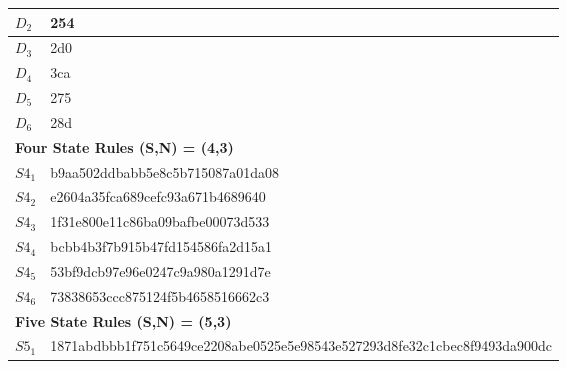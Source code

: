 \documentclass{elsarticle}
\begin{document}
\begin{multicols}{2}
\begin{table}[!htbp]
\begin{tabular}{|p{2cm}|l|}
$D_{2}$ &   254 \\ \hline
$D_{3}$ &   2d0 \\ \hline
$D_{4}$ &   3ca \\ \hline
$D_{5}$ &   275 \\ \hline
$D_{6}$ &   28d \\ \hline
\multicolumn{2}{|l|}{\textbf{Four State Rules (S,N) = (4,3)}} \\ \hline
$S4_{1}$ &   b9aa502ddbabb5e8c5b715087a01da08\\ \hline
$S4_{2}$ &   e2604a35fca689cefc93a671b4689640 \\ \hline
$S4_{3}$ &   1f31e800e11c86ba09bafbe00073d533\\ \hline
$S4_{4}$ &   bcbb4b3f7b915b47fd154586fa2d15a1\\ \hline
$S4_{5}$ &   53bf9dcb97e96e0247c9a980a1291d7e \\ \hline
$S4_{6}$ &   73838653ccc875124f5b4658516662c3\\
\hline
\multicolumn{2}{|l|}{\textbf{Five State Rules (S,N) = (5,3)}} \\ \hline
 $S5_{1}$ & %
    1871abdbbb1f751c5649ce2208abe0525e5e98543e527293d8fe32c1cbec8f9493da900dc 

\end{tabular}
\end{table}
\end{multicols}
\end{document}
